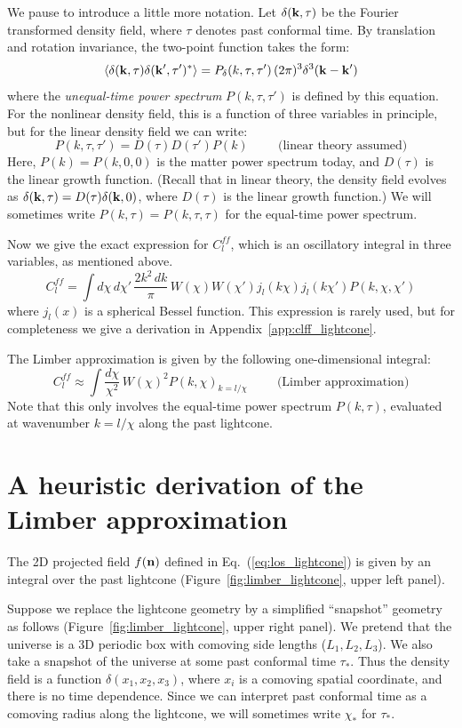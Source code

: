 \documentclass[aps,prd,superscriptaddress,groupedaddress,nofootinbib,nobibnotes]{revtex4}
\newcommand{\be}{\begin{equation}}
\newcommand{\ee}{\end{equation}}
\def\n{{\bf n}}
\def\k{{\bf k}}
\begin{document}
We pause to introduce a little more notation.
Let $\delta(\k,\tau)$ be the Fourier transformed density field, where $\tau$ denotes past conformal time.
By translation and rotation invariance, the two-point function takes the form:
\be
\langle \delta(\k,\tau) \delta(\k',\tau')^* \rangle = P_\delta(k,\tau,\tau') \, (2\pi)^3\delta^3(\k-\k')
\ee
where the {\em unequal-time power spectrum} $P(k,\tau,\tau')$ is defined by this equation.
For the nonlinear density field, this is a function of three variables in principle, but for the linear
density field we can write:
\be
P(k,\tau,\tau') = D(\tau) D(\tau') P(k)  \hspace{1cm} \mbox{(linear theory assumed)}
\ee
Here, $P(k) = P(k,0,0)$ is the matter power spectrum today, and $D(\tau)$ is the
linear growth function.  (Recall that in linear theory, the density field evolves as 
$\delta(\k,\tau) = D(\tau) \delta(\k,0)$, where $D(\tau)$ is the linear growth function.)
We will sometimes write $P(k,\tau) = P(k,\tau,\tau)$ for the equal-time
power spectrum.

Now we give the exact expression for $C_l^{ff}$, which is an oscillatory integral in three
variables, as mentioned above.
\be
C_l^{ff} = \int d\chi \, d\chi' \, \frac{2k^2 \, dk}{\pi} \, W(\chi) W(\chi') j_l(k\chi) j_l(k\chi') P(k,\chi,\chi')  \label{eq:clff_exact}
\ee
where $j_l(x)$ is a spherical Bessel function.  This expression is rarely used, 
but for completeness we give a derivation in Appendix~\ref{app:clff_lightcone}.

The Limber approximation is given by the following one-dimensional integral:
\be
C_l^{ff} \approx \int \frac{d\chi}{\chi^2} \, W(\chi)^2 P(k,\chi)_{k=l/\chi}  \hspace{1cm} \mbox{(Limber approximation)} \label{eq:clff_limber}
\ee
Note that this only involves the equal-time power spectrum $P(k,\tau)$, evaluated at wavenumber $k=l/\chi$
along the past lightcone.

\section{A heuristic derivation of the Limber approximation}
\label{sec:heuristic_derivation}

The 2D projected field $f(\n)$ defined in Eq.~(\ref{eq:los_lightcone}) is 
given by an integral over the past lightcone (Figure~\ref{fig:limber_lightcone}, upper left panel).

Suppose we replace the lightcone geometry by a simplified ``snapshot'' geometry as follows (Figure~\ref{fig:limber_lightcone}, upper right panel).
We pretend that the universe is a 3D periodic box with comoving side lengths ($L_1, L_2, L_3$).
We also take a snapshot of the universe at some past conformal time $\tau_*$.
Thus the density field is a function $\delta(x_1, x_2, x_3)$, where $x_i$ is a comoving spatial coordinate,
and there is no time dependence.
Since we can interpret past conformal time as a comoving radius along the lightcone, we will sometimes write $\chi_*$ for $\tau_*$.
\end{document}
